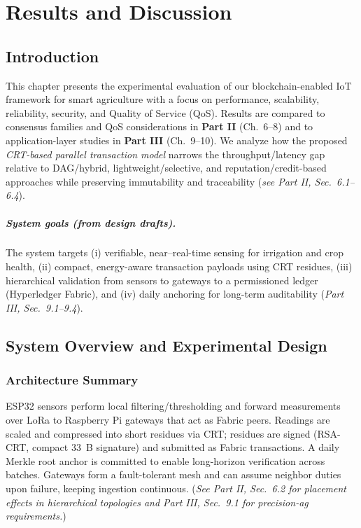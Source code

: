 \chapter{Results and Discussion}
\label{chap:results}

\section{Introduction}
This chapter presents the experimental evaluation of our blockchain-enabled IoT framework for smart agriculture with a focus on performance, scalability, reliability, security, and Quality of Service (QoS). Results are compared to consensus families and QoS considerations in \textbf{Part II} (Ch.~6–8) and to application-layer studies in \textbf{Part III} (Ch.~9–10). We analyze how the proposed \emph{CRT-based parallel transaction model} narrows the throughput/latency gap relative to DAG/hybrid, lightweight/selective, and reputation/credit-based approaches while preserving immutability and traceability (\emph{see Part II, Sec.~6.1–6.4}).

\paragraph{System goals (from design drafts).}
The system targets (i) verifiable, near–real-time sensing for irrigation and crop health, (ii) compact, energy-aware transaction payloads using CRT residues, (iii) hierarchical validation from sensors to gateways to a permissioned ledger (Hyperledger Fabric), and (iv) daily anchoring for long-term auditability (\emph{Part III, Sec.~9.1–9.4}).\ %

\section{System Overview and Experimental Design}

\subsection{Architecture Summary}
ESP32 sensors perform local filtering/thresholding and forward measurements over LoRa to Raspberry Pi gateways that act as Fabric peers. Readings are scaled and compressed into short residues via CRT; residues are signed (RSA-CRT, compact 33~B signature) and submitted as Fabric transactions. A daily Merkle root anchor is committed to enable long-horizon verification across batches. Gateways form a fault-tolerant mesh and can assume neighbor duties upon failure, keeping ingestion continuous. (\emph{See Part II, Sec.~6.2 for placement effects in hierarchical topologies and Part III, Sec.~9.1 for precision-ag requirements.}) %

